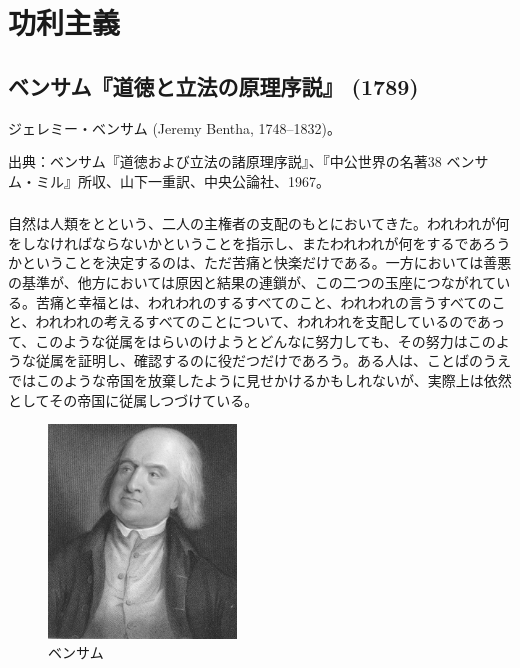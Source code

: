 \chapter{功利主義}




\section{ベンサム『道徳と立法の原理序説』 (1789)}

ジェレミー・ベンサム (Jeremy Bentha, 1748--1832)。

出典：ベンサム『道徳および立法の諸原理序説』、『中公世界の名著38 ベンサム・ミル』所収、山下一重訳、中央公論社、1967。

\subsection{}


    自然は人類をとという、二人の主権者の支配のもとにおいてきた。われわれが何をしなければならないかということを指示し、またわれわれが何をするであろうかということを決定するのは、ただ苦痛と快楽だけである。一方においては善悪の基準が、他方においては原因と結果の連鎖が、この二つの玉座につながれている。苦痛と幸福とは、われわれのするすべてのこと、われわれの言うすべてのこと、われわれの考えるすべてのことについて、われわれを支配しているのであって、このような従属をはらいのけようとどんなに努力しても、その努力はこのような従属を証明し、確認するのに役だつだけであろう。ある人は、ことばのうえではこのような帝国を放棄したように見せかけるかもしれないが、実際上は依然としてその帝国に従属しつづけている。


     \begin{figure}[htbp]
       \centering
         \includegraphics[width=50mm]{images/bentham.jpg}
       \caption{ベンサム}
     \end{figure}

\subsection{}

